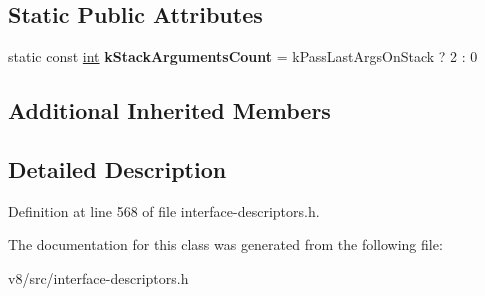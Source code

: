 \subsection*{Static Public Attributes}
\begin{DoxyCompactItemize}
\item 
\mbox{\label{classv8_1_1internal_1_1StoreGlobalDescriptor_a5c5218bb6ff32342c3ae0bf1b86e371f}} 
static const \mbox{\hyperlink{classint}{int}} {\bfseries k\+Stack\+Arguments\+Count} = k\+Pass\+Last\+Args\+On\+Stack ? 2 \+: 0
\end{DoxyCompactItemize}
\subsection*{Additional Inherited Members}


\subsection{Detailed Description}


Definition at line 568 of file interface-\/descriptors.\+h.



The documentation for this class was generated from the following file\+:\begin{DoxyCompactItemize}
\item 
v8/src/interface-\/descriptors.\+h\end{DoxyCompactItemize}
